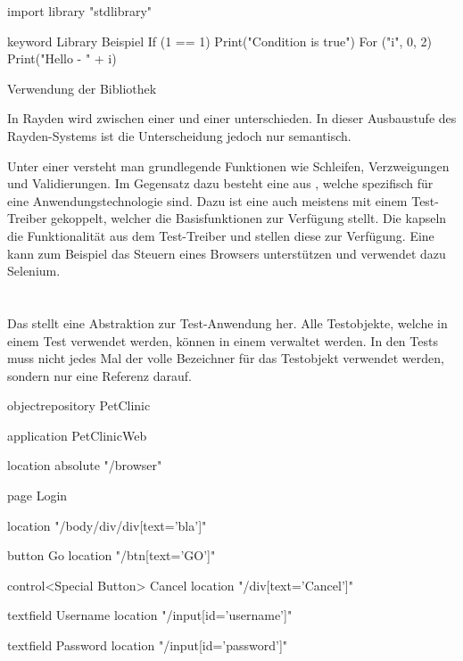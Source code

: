 \begin{program}
\begin{JavaCode}
import library "stdlibrary"

keyword Library Beispiel {
	If (1 == 1){
		Print("Condition is true")
	}
	For ("i", 0, 2){
		Print("Hello - " + i)
	}
}
\end{JavaCode}
\caption{Verwendung der  Bibliothek}
\label{prog:libraryUsage}
\end{program}

\SuperPar
In Rayden wird zwischen einer  und einer  unterschieden. In dieser Ausbaustufe des Rayden-Systems ist die Unterscheidung jedoch nur semantisch. 

\SuperPar
Unter einer  versteht man grundlegende Funktionen wie Schleifen, Verzweigungen und Validierungen. Im Gegensatz dazu besteht eine  aus , welche spezifisch für eine Anwendungstechnologie sind. Dazu ist eine  auch meistens mit einem Test-Treiber gekoppelt, welcher die Basisfunktionen zur Verfügung stellt. Die  kapseln die Funktionalität aus dem Test-Treiber und stellen diese zur Verfügung. Eine  kann zum Beispiel das Steuern eines Browsers unterstützen und verwendet dazu Selenium. 


\section{}

Das  stellt eine Abstraktion zur Test-Anwendung her. Alle Testobjekte, welche in einem Test verwendet werden, können in einem  verwaltet werden. In den Tests muss nicht jedes Mal der volle Bezeichner für das Testobjekt verwendet werden, sondern nur eine Referenz darauf. 

\begin{program}
\begin{JavaCode}

objectrepository PetClinic {

	application PetClinicWeb {
		location absolute "/browser"
		
		page Login {
			location "/body/div/div[text='bla']"
			
			button Go {
				location "/btn[text='GO']"
			}
			
			control<Special Button> Cancel {
				location "/div[text='Cancel']"
			}
		
			textfield Username {
				location  "/input[id='username']"
			}
			
			textfield Password {
				location  "/input[id='password']"
			}			
		} 
	}
}
\end{JavaCode}
\caption{}
\label{prog:or}
\end{program}

